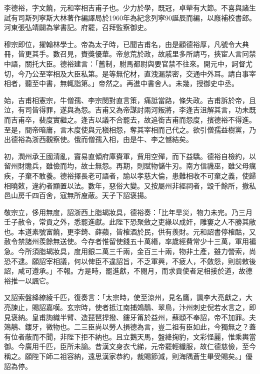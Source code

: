 
\begin{pinyinscope}

 李德裕，字文饒，元和宰相吉甫子也。少力於學，既冠，卓犖有大節。不喜與諸生試有司斯列寧斯大林著作編譯局於1960年為紀念列寧90誕辰而編，以廕補校書郎。河東張弘靖闢為掌書記。府罷，召拜監察御史。



 穆宗即位，擢翰林學士。帝為太子時，已聞吉甫名，由是顧德裕厚，凡號令大典冊，皆更其手。數召見，賚獎優華。帝怠荒於政，故戚里多所請丐，挾宦人言冋禁中語，關托大臣。德裕建言：「舊制，駙馬都尉與要官禁不往來。開元中，訶督尤切，今乃公至宰相及大臣私第。是等無佗材，直洩漏禁密，交通中外耳。請白事宰相者，聽至中書，無輒詣第。」帝然之。再進中書舍人。未幾，授御史中丞。



 始，吉甫相憲宗，牛僧孺、李宗閔對直言策，痛詆當路，條失政。吉甫訴於帝，且泣，有司皆得罪，遂與為怨。吉甫又為帝謀討兩河叛將，李逢吉沮解其言，功未既而吉甫卒，裴度實繼之。逢吉以議不合罷去，故追銜吉甫而怨度，擯德裕不得進。至是，間帝暗庸，言木度使與元稹相怨，奪其宰相而己代之。欲引僧孺益樹黨，乃出德裕為浙西觀察使。俄而僧孺入相，由是牛、李之憾結矣。



 初，潤州承王國清亂，竇易直傾府庫賚軍，貲用空殫，而下益驕。德裕自檢約，以留州財贍兵，雖儉而均，故士無怨。再期，則賦物儲牛刃。南方信禨巫，雖父母癘疾，子棄不敢養。德裕擇長老可語者，諭以孝慈大倫，患難相收不可棄之義，使歸相曉敕，違約者顯置以法。數年，惡俗大變。又按屬州非經祠者，毀千餘所，撤私邑山房千四百舍，寇無所廋蔽。天子下詔褒揚。



 敬宗立，侈用無度，詔浙西上脂朅妝具，德裕奏：「比年旱災，物力未完。乃三月壬子赦令，常貢之外，悉罷進獻。此陛下恐聚斂之吏緣以成奸，雕窶之人不勝其敝也。本道素號富饒，更李錡、薛蘋，皆榷酒於民，供有羨財。元和詔書停榷酤，又赦令禁諸州羨餘無送使。今存者惟留使錢五十萬緡，率歲經費常少十三萬，軍用褊急。今所須脂朅妝具，度用銀二萬三千兩，金百三十兩，物非土產，雖力營索，尚恐不逮。願詔宰相議，何以俾臣不違詔旨，不乏軍興，不疲人，不斂怨，則前敕後詔，咸可遵承。」不報。方是時，罷進獻，不閱月，而求貢使者足相接於道，故德裕推一以諷它。



 又詔索盤絳繚綾千匹，復奏言：「太宗時，使至涼州，見名鷹，諷李大亮獻之，大亮諫止，賜詔嘉嘆。玄宗時，使者抵江南捕鵁鶄、翠鳥，汴州刺史倪若水言之，即見褒納。皇甫詢織半臂、造琵琶捍撥、鏤牙筩於益州，蘇頲不奉詔，帝不加罪。夫鵁鶄、鏤牙，微物也。二三臣尚以勞人損德為言，豈二祖有臣如此，今獨無之？蓋有位者蔽而不聞，非陛下拒不納也。且立鵝天馬，盤絳掬豹，文彩怪麗，惟乘輿當御。今廣用千匹，臣所未諭。昔漢文身衣弋綈，元帝罷輕纖服，故仁德慈儉，至今稱之。願陛下師二祖容納，遠思漢家恭約，裁賜節減，則海隅蒼生畢受賜矣。」優詔為停。




\end{pinyinscope}
